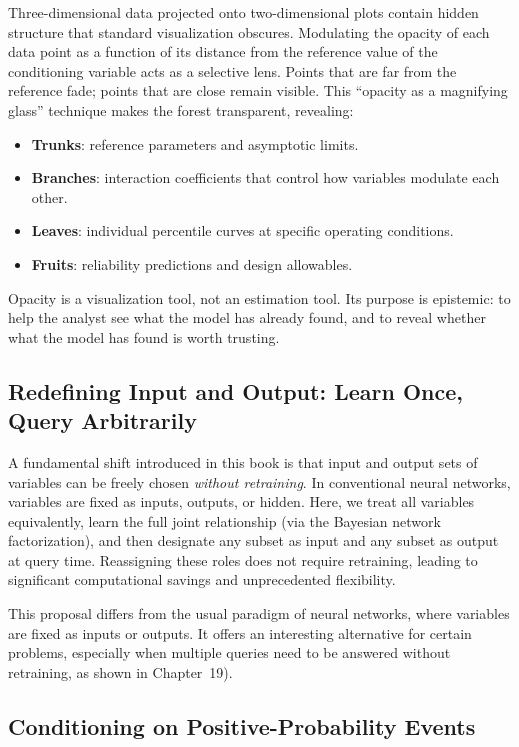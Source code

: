 Three-dimensional data projected onto two-dimensional plots contain hidden structure that standard visualization obscures. Modulating the opacity of each data point as a function of its distance from the reference value of the conditioning variable acts as a selective lens. Points that are far from the reference fade; points that are close remain visible. This ``opacity as a magnifying glass'' technique makes the forest transparent, revealing:

\begin{itemize}
  \item \textbf{Trunks}: reference parameters and asymptotic limits.
  \item \textbf{Branches}: interaction coefficients that control how variables modulate each other.
  \item \textbf{Leaves}: individual percentile curves at specific operating conditions.
  \item \textbf{Fruits}: reliability predictions and design allowables.
\end{itemize}

Opacity is a visualization tool, not an estimation tool. Its purpose is epistemic: to help the analyst see what the model has already found, and to reveal whether what the model has found is worth trusting.

\subsection{Redefining Input and Output: Learn Once, Query Arbitrarily}

A fundamental shift introduced in this book is that input and output sets of variables can be freely chosen \emph{without retraining}. In conventional neural networks, variables are fixed as inputs, outputs, or hidden. Here, we treat all variables equivalently, learn the full joint relationship (via the Bayesian network factorization), and then designate any subset as input and any subset as output at query time. Reassigning these roles does not require retraining, leading to significant computational savings and unprecedented flexibility.

This proposal differs from the usual paradigm of neural networks, where variables are fixed as inputs or outputs. It offers an interesting alternative for certain problems, especially when multiple queries need to be answered without retraining, as shown in Chapter~19).

\subsection{Conditioning on Positive-Probability Events}

